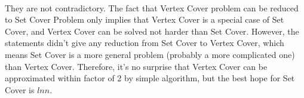 \begin{problem}{4} ~\\
They are not contradictory. The fact that Vertex Cover problem can be reduced to Set Cover Problem only implies that Vertex Cover is a special case of Set Cover, and Vertex Cover can be solved not harder than Set Cover. However, the statements didn't give any reduction from Set Cover to Vertex Cover, which means Set Cover is a more general problem (probably a more complicated one) than Vertex Cover. Therefore, it's no surprise that Vertex Cover can be approximated within factor of 2 by simple algorithm, but the best hope for Set Cover is $ln n$.
\end{problem}